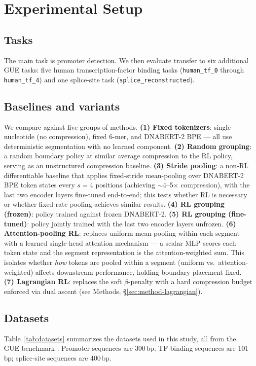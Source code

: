 \documentclass[sigconf,screen]{acmart}
\newcommand{\dnabert}{DNABERT-2\xspace}
\begin{document}
\section{Experimental Setup}
\subsection{Tasks}
The main task is promoter detection. We then evaluate transfer to six additional GUE tasks: five human transcription-factor binding tasks (\texttt{human\_tf\_0} through \texttt{human\_tf\_4}) and one splice-site task (\texttt{splice\_reconstructed}).

\subsection{Baselines and variants}
We compare against five groups of methods. \textbf{(1) Fixed tokenizers}: single nucleotide (no compression), fixed 6-mer, and DNABERT-2 BPE — all use deterministic segmentation with no learned component. \textbf{(2) Random grouping}: a random boundary policy at similar average compression to the RL policy, serving as an unstructured compression baseline. \textbf{(3) Stride pooling}: a non-RL differentiable baseline that applies fixed-stride mean-pooling over \dnabert BPE token states every $s=4$ positions (achieving $\sim$4--5$\times$ compression), with the last two encoder layers fine-tuned end-to-end; this tests whether RL is necessary or whether fixed-rate pooling achieves similar results. \textbf{(4) RL grouping (frozen)}: policy trained against frozen \dnabert. \textbf{(5) RL grouping (fine-tuned)}: policy jointly trained with the last two encoder layers unfrozen. \textbf{(6) Attention-pooling RL}: replaces uniform mean-pooling within each segment with a learned single-head attention mechanism — a scalar MLP scores each token state and the segment representation is the attention-weighted sum. This isolates whether \emph{how} tokens are pooled within a segment (uniform vs.\ attention-weighted) affects downstream performance, holding boundary placement fixed. \textbf{(7) Lagrangian RL}: replaces the soft $\beta$-penalty with a hard compression budget enforced via dual ascent (see Methods, \S\ref{sec:method-lagrangian}).

\subsection{Datasets}
Table~\ref{tab:datasets} summarizes the datasets used in this study, all from the GUE benchmark \cite{zhou2024dnabert2}. Promoter sequences are 300\,bp; TF-binding sequences are 101\,bp; splice-site sequences are 400\,bp.
\end{document}
